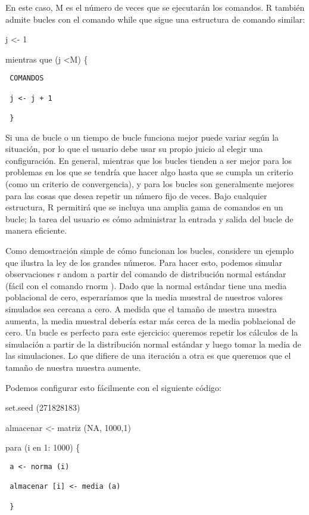 \documentclass[
]{book}
\begin{document}
En este caso, M es el número de veces que se ejecutarán los comandos. R también admite bucles con el comando while que sigue una estructura de comando similar:

j \textless- 1

mientras que (j \textless M) \{

\begin{verbatim}
 COMANDOS

 j <- j + 1

 }
\end{verbatim}

Si una de bucle o un tiempo de bucle funciona mejor puede variar según la situación, por lo que el usuario debe usar su propio juicio al elegir una configuración. En general, mientras que los bucles tienden a ser mejor para los problemas en los que se tendría que hacer algo hasta que se cumpla un criterio (como un criterio de convergencia), y para los bucles son generalmente mejores para las cosas que desea repetir un número fijo de veces. Bajo cualquier estructura, R permitirá que se incluya una amplia gama de comandos en un bucle; la tarea del usuario es cómo administrar la entrada y salida del bucle de manera eficiente.

Como demostración simple de cómo funcionan los bucles, considere un ejemplo que ilustra la ley de los grandes números. Para hacer esto, podemos simular observaciones r andom a partir del comando de distribución normal estándar (fácil con el comando rnorm ). Dado que la normal estándar tiene una media poblacional de cero, esperaríamos que la media muestral de nuestros valores simulados sea cercana a cero. A medida que el tamaño de nuestra muestra aumenta, la media muestral debería estar más cerca de la media poblacional de cero. Un bucle es perfecto para este ejercicio: queremos repetir los cálculos de la simulación a partir de la distribución normal estándar y luego tomar la media de las simulaciones. Lo que difiere de una iteración a otra es que queremos que el tamaño de nuestra muestra aumente.

Podemos configurar esto fácilmente con el siguiente código:

set.seed (271828183)

almacenar \textless- matriz (NA, 1000,1)

para (i en 1: 1000) \{

\begin{verbatim}
 a <- norma (i)

 almacenar [i] <- media (a)

 }
\end{verbatim}
\end{document}
